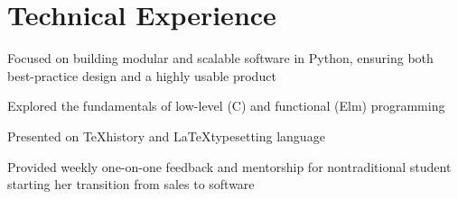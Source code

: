 \documentclass[letterpaper]{deedy-resume} %
\begin{document}
\begin{minipage}[t]{0.66\textwidth} %

%
%
\section{Technical Experience}


\vspace{\topsep} %
\begin{tightitemize}
\item Focused on building modular and scalable software in Python, ensuring both best-practice design and a highly usable product
\item Explored the fundamentals of low-level (C) and functional (Elm) programming
\item Presented on \TeX  history and \LaTeX  typesetting language
\item Provided weekly one-on-one feedback and mentorship for nontraditional student starting her transition from sales to software
\end{tightitemize}

\sectionspace %


%


\end{minipage}
\end{document}
